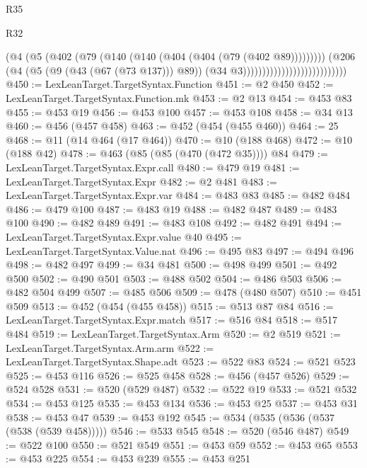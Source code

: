 \begin{lexlean}{R35}
\begin{lexlean}{R32}
\begin{coremodule}
{{{{{{{{{{{{{{{{{{{{{{{{{{{{{{{{{{{{{{{{{{{{{{{{{{{                                                  (@4
                                                    (@5
                                                      (@402
                                                        (@79
                                                          (@140
                                                            (@140
                                                              (@404 (@404 (@79 (@402 @89)))))))))
                                                    (@206
                                                      (@4
                                                        (@5 (@9 (@43 (@67 (@73 @137))) @89))
                                                        (@34 @3)))))))))))))))))))))))))))
@450 := LexLeanTarget.TargetSyntax.Function
@451 := @2 @450
@452 := LexLeanTarget.TargetSyntax.Function.mk
@453 := @2 @13
@454 := @453 @83
@455 := @453 @19
@456 := @453 @100
@457 := @453 @108
@458 := @34 @13
@460 := @456 (@457 @458)
@463 := @452 (@454 (@455 @460))
@464 := 25
@468 := @11 (@14 @464 (@17 @464))
@470 := @10 (@188 @468)
@472 := @10 (@188 @42)
@478 := @463 (@85 (@85 (@470 (@472 @35)))) @84
@479 := LexLeanTarget.TargetSyntax.Expr.call
@480 := @479 @19
@481 := LexLeanTarget.TargetSyntax.Expr
@482 := @2 @481
@483 := LexLeanTarget.TargetSyntax.Expr.var
@484 := @483 @83
@485 := @482 @484
@486 := @479 @100
@487 := @483 @19
@488 := @482 @487
@489 := @483 @100
@490 := @482 @489
@491 := @483 @108
@492 := @482 @491
@494 := LexLeanTarget.TargetSyntax.Expr.value @40
@495 := LexLeanTarget.TargetSyntax.Value.nat
@496 := @495 @83
@497 := @494 @496
@498 := @482 @497
@499 := @34 @481
@500 := @498 @499
@501 := @492 @500
@502 := @490 @501
@503 := @488 @502
@504 := @486 @503
@506 := @482 @504 @499
@507 := @485 @506
@509 := @478 (@480 @507)
@510 := @451 @509
@513 := @452 (@454 (@455 @458))
@515 := @513 @87 @84
@516 := LexLeanTarget.TargetSyntax.Expr.match
@517 := @516 @84
@518 := @517 @484
@519 := LexLeanTarget.TargetSyntax.Arm
@520 := @2 @519
@521 := LexLeanTarget.TargetSyntax.Arm.arm
@522 := LexLeanTarget.TargetSyntax.Shape.adt
@523 := @522 @83
@524 := @521 @523
@525 := @453 @116
@526 := @525 @458
@528 := @456 (@457 @526)
@529 := @524 @528
@531 := @520 (@529 @487)
@532 := @522 @19
@533 := @521 @532
@534 := @453 @125
@535 := @453 @134
@536 := @453 @25
@537 := @453 @31
@538 := @453 @47
@539 := @453 @192
@545 := @534 (@535 (@536 (@537 (@538 (@539 @458)))))
@546 := @533 @545
@548 := @520 (@546 @487)
@549 := @522 @100
@550 := @521 @549
@551 := @453 @59
@552 := @453 @65
@553 := @453 @225
@554 := @453 @239
@555 := @453 @251
}}}}}}}}}}}}}}}}}}}}}}}}}}}}}}}}}}}}}}}}}}}}}}}}}}}
\end{coremodule}
\end{lexlean}
\end{lexlean}
